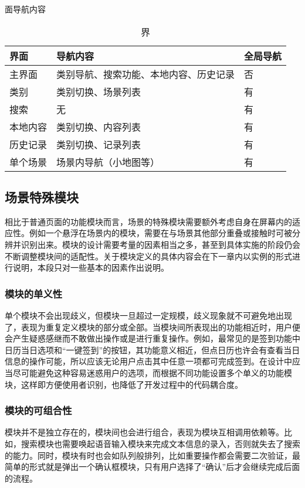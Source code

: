 \begin{table}[htbp]
\centering
\caption 界面导航内容
\vskip 5pt
\begin{tabular}{lll}
\toprule
界面 & 导航内容 & 全局导航\\
\midrule
主界面 & 类别导航、搜索功能、本地内容、历史记录 & 否\\
类别 & 类别切换、场景列表 & 有 \\
搜索 & 无 & 有 \\
本地内容 & 类别切换、内容列表 & 有 \\
历史记录 & 类别切换、记录列表 & 有 \\
单个场景 & 场景内导航（小地图等） & 有 \\
\bottomrule
\end{tabular}
\label{tab:nav}
\end{table}

\subsection{场景特殊模块}
相比于普通页面的功能模块而言，场景的特殊模块需要额外考虑自身在屏幕内的适应性。例如一个悬浮在场景内的模块，需要在与场景其他部分重叠或接触时可被分辨并识别出来。模块的设计需要考量的因素相当之多，甚至到具体实施的阶段仍会不断调整模块间的适配性。关于模块定义的具体内容会在下一章内以实例的形式进行说明，本段只对一些基本的因素作出说明。

\subsubsection{模块的单义性}
单个模块不会出现歧义，但模块一旦超过一定规模，歧义现象就不可避免地出现了，表现为重复定义模块的部分或全部。当模块间所表现出的功能相近时，用户便会产生疑惑感继而不敢做出操作或是进行重复操作。例如，最常见的是签到功能中日历当日选项和“一键签到”的按钮，其功能意义相近，但点日历也许会有查看当日信息的操作可能，所以应该无论用户点击其中任意一项都可完成签到。在设计中应当尽可能避免这种容易迷惑用户的选项，而根据不同功能设置多个单义的功能模块，这样即方便使用者识别，也降低了开发过程中的代码耦合度。

\subsubsection{模块的可组合性}
模块并不是独立存在的，模块间也会进行组合，表现为模块互相调用依赖等。比如，搜索模块也需要唤起语音输入模块来完成文本信息的录入，否则就失去了搜索的能力。同时，模块有时也会如队列般排列，比如重要操作都会需要二次验证，最简单的形式就是弹出一个确认框模块，只有用户选择了“确认”后才会继续完成后面的流程。


